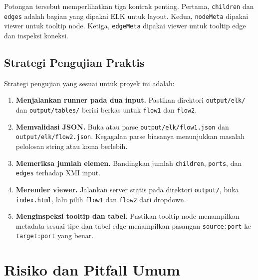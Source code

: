 Potongan tersebut memperlihatkan tiga kontrak penting. Pertama, \texttt{children} dan \texttt{edges} adalah bagian yang dipakai ELK untuk layout. Kedua, \texttt{nodeMeta} dipakai viewer untuk tooltip node. Ketiga, \texttt{edgeMeta} dipakai viewer untuk tooltip edge dan inspeksi koneksi.

\subsection{Strategi Pengujian Praktis}

Strategi pengujian yang sesuai untuk proyek ini adalah:
\begin{enumerate}
  \item \textbf{Menjalankan runner pada dua input.} Pastikan direktori \texttt{output/elk/} dan \texttt{output/tables/} berisi berkas untuk \texttt{flow1} dan \texttt{flow2}.
  \item \textbf{Memvalidasi JSON.} Buka atau parse \texttt{output/elk/flow1.json} dan \texttt{output/elk/flow2.json}. Kegagalan parse biasanya menunjukkan masalah pelolosan string atau koma berlebih.
  \item \textbf{Memeriksa jumlah elemen.} Bandingkan jumlah \texttt{children}, \texttt{ports}, dan \texttt{edges} terhadap XMI input.
  \item \textbf{Merender viewer.} Jalankan server statis pada direktori \texttt{output/}, buka \texttt{index.html}, lalu pilih \texttt{flow1} dan \texttt{flow2} dari dropdown.
  \item \textbf{Menginspeksi tooltip dan tabel.} Pastikan tooltip node menampilkan metadata sesuai tipe dan tabel edge menampilkan pasangan \texttt{source:port} ke \texttt{target:port} yang benar.
\end{enumerate}

\section{Risiko dan Pitfall Umum}

